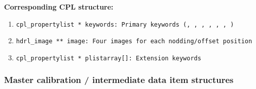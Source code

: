 \begin{datastructdef}
\textbf{Corresponding \ac{CPL} structure:}
\begin{enumerate}
    \item \texttt{cpl\_propertylist * keywords: Primary keywords (,  ,  ,  ,  ,  , )}
    \item \texttt{hdrl\_image ** image: Four images for each nodding/offset position}
    \item \texttt{cpl\_propertylist * plistarray[]: Extension keywords}
\end{enumerate}
\end{datastructdef}





\subsubsection{Master calibration / intermediate data item structures}\label{sssec:lmsprocdatastructs}


